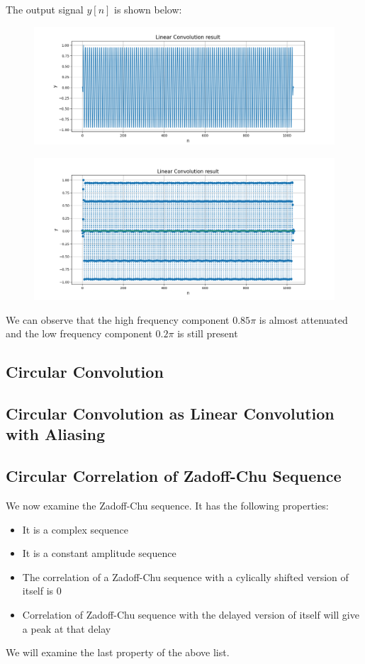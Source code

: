 \documentclass[12pt, a4paper]{article}
\begin{document}
The output signal $y[n]$ is shown below:
\begin{figure}[H]
    \centering
    \includegraphics[scale = 0.6]{Figure_3.png}
    \label{fig:sample}
\end{figure}
\begin{figure}[H]
    \centering
    \includegraphics[scale = 0.6]{Figure_3b.png}
    \label{fig:sample}
\end{figure}
\begin{center}
    We can observe that the high frequency component $0.85\pi$ is almost attenuated and the low frequency component $0.2\pi$ is still present
\end{center}
\subsection{Circular Convolution}
\subsection{Circular Convolution as Linear Convolution with Aliasing}

\subsection{Circular Correlation of Zadoff-Chu Sequence}
We now examine the Zadoff-Chu sequence. It has the following properties:
\begin{itemize}
    \item It is a complex sequence
    \item It is a constant amplitude sequence
    \item The correlation of a Zadoff-Chu sequence with a cylically shifted version of itself is 0
    \item  Correlation of Zadoff-Chu sequence with the delayed version of itself will give
    a peak at that delay
\end{itemize}
We will examine the last property of the above list.
\end{document}
